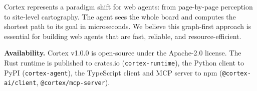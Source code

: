 \documentclass[10pt, twocolumn]{article}
\begin{document}
Cortex represents a paradigm shift for web agents: from page-by-page perception to site-level cartography. The agent sees the whole board and computes the shortest path to its goal in microseconds. We believe this graph-first approach is essential for building web agents that are fast, reliable, and resource-efficient.

\textbf{Availability.} Cortex v1.0.0 is open-source under the Apache-2.0 license. The Rust runtime is published to crates.io (\texttt{cortex-runtime}), the Python client to PyPI (\texttt{cortex-agent}), the TypeScript client and MCP server to npm (\texttt{@cortex-ai/client}, \texttt{@cortex/mcp-server}).



\end{document}
